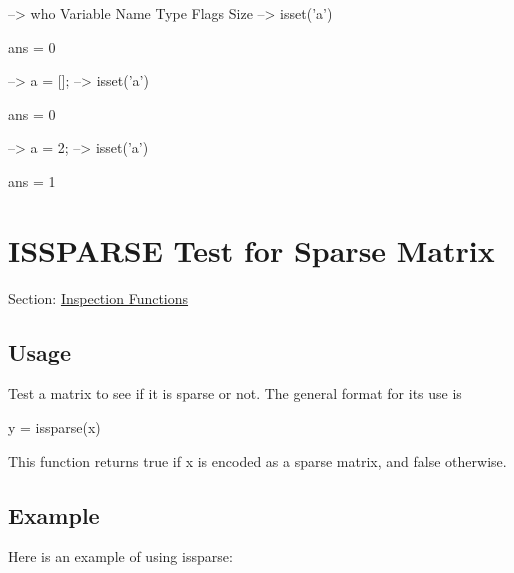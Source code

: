 \begin{DoxyVerbInclude}
--> who
  Variable Name       Type   Flags             Size
--> isset('a')

ans = 
 0 

--> a = [];
--> isset('a')

ans = 
 0 

--> a = 2;
--> isset('a')

ans = 
 1 
\end{DoxyVerbInclude}
 \hypertarget{inspection_issparse}{}\section{I\-S\-S\-P\-A\-R\-S\-E Test for Sparse Matrix}\label{inspection_issparse}
Section\-: \hyperlink{sec_inspection}{Inspection Functions} \hypertarget{vtkwidgets_vtkxyplotwidget_Usage}{}\subsection{Usage}\label{vtkwidgets_vtkxyplotwidget_Usage}
Test a matrix to see if it is sparse or not. The general format for its use is \begin{DoxyVerb}   y = issparse(x)
\end{DoxyVerb}
 This function returns true if {\ttfamily x} is encoded as a sparse matrix, and false otherwise. \hypertarget{variables_struct_Example}{}\subsection{Example}\label{variables_struct_Example}
Here is an example of using {\ttfamily issparse}\-:


